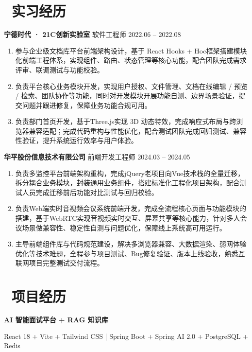 ﻿\documentclass[10pt,a4paper]{ctexart}
\newcommand{\sect}[2]{%
  \section{\texorpdfstring{\makebox[\widthof{\faGraduationCap}][c]{{\mdseries\color{themecolor}#1}}\ #2}{#2}}
}
\begin{document}
\sect{\faUniversity}{实习经历}
\vspace{4pt}
\noindent\textbf{宁德时代 · 21C创新实验室} \hfill 软件工程师 \hfill 2022.06 -- 2022.08
\begin{enumerate}[topsep=0pt, partopsep=1pt, itemsep=2pt, parsep=0pt]
  \item 参与企业级文档库平台前端架构设计，基于 React Hooks + Hoc框架搭建模块化前端工程体系，实现组件、路由、状态管理等核心功能，配合团队完成需求评审、联调测试与功能校验。
  \item 负责平台核心业务模块开发，实现用户授权、文件管理、文档在线编辑 / 预览 / 检索、团队协作等功能，同时对开发模块开展功能自测、边界场景验证，提交问题并跟进修复，保障业务功能合规可用。
  \item 负责部门首页开发，基于Three.js实现 3D 动态特效，完成响应式布局与跨浏览器兼容适配；完成代码重构与性能优化，配合测试团队完成回归测试、兼容性验证，提升系统运行效率与用户体验。
\end{enumerate}
\vspace{4pt}
\noindent\textbf{华平股份信息技术有限公司} \hfill 前端开发工程师 \hfill 2024.03 -- 2024.05
\begin{enumerate}[topsep=0pt, partopsep=1pt, itemsep=2pt, parsep=0pt]
  \item 负责多监控平台前端架构重构，完成jQuery老项目向Vue技术栈的全量迁移，拆分耦合业务模块，封装通用业务组件，搭建标准化工程化项目架构，配合测试人员完成迁移前后功能对比测试与回归校验。
  \item 负责Web端实时音视频会议系统前端开发，完成全流程核心页面与功能模块的搭建，基于WebRTC实现音视频实时交互、屏幕共享等核心能力，针对多人会议场景做兼容性、稳定性自测与问题优化，保障线上系统高可用运行。
  \item 主导前端组件库与代码规范建设，解决多浏览器兼容、大数据渲染、弱网体验优化等技术难题，全程参与项目测试、Bug修复验证、版本上线验收，熟悉互联网项目完整测试交付流程。
\end{enumerate}

\sect{\faFileText}{项目经历}
\textbf{AI 智能面试平台 + RAG 知识库}

React 18 + Vite + Tailwind CSS \quad | \quad Spring Boot + Spring AI 2.0 + PostgreSQL + Redis
\end{document}
